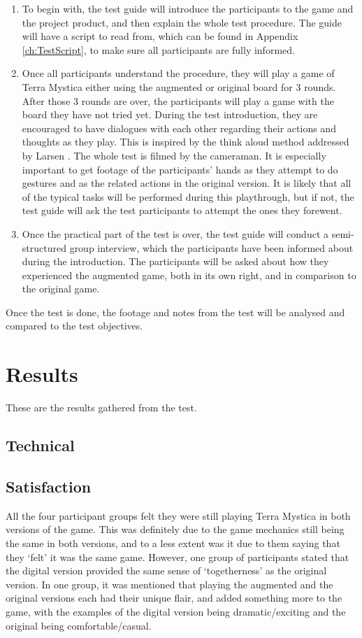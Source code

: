 \begin{enumerate}
\item To begin with, the test guide will introduce the participants to the game and the project product, and then explain the whole test procedure. The guide will have a script to read from, which can be found in Appendix \ref{ch:TestScript}, to make sure all participants are fully informed.
\item Once all participants understand the procedure, they will play a game of Terra Mystica either using the augmented or original board for 3 rounds. After those 3 rounds are over, the participants will play a game with the board they have not tried yet. During the test introduction, they are encouraged to have dialogues with each other regarding their actions and thoughts as they play. This is inspired by the think aloud method addressed by Larsen \citep{TestingLecture}. The whole test is filmed by the cameraman. It is especially important to get footage of the participants' hands as they attempt to do gestures and as the related actions in the original version. It is likely that all of the typical tasks will be performed during this playthrough, but if not, the test guide will ask the test participants to attempt the ones they forewent.
\item Once the practical part of the test is over, the test guide will conduct a semi-structured group interview, which the participants have been informed about during the introduction. The participants will be asked about how they experienced the augmented game, both in its own right, and in comparison to the original game.
\end{enumerate}

Once the test is done, the footage and notes from the test will be analysed and compared to the test objectives.

\section{Results}
These are the results gathered from the test.

\subsection{Technical}
\subsection{Satisfaction}\label{satisfactionResult}
All the four participant groups felt they were still playing Terra Mystica in both versions of the game. This was definitely due to the game mechanics still being the same in both versions, and to a less extent was it due to them saying that they ‘felt’ it was the same game. However, one group of participants stated that the digital version provided the same sense of ‘togetherness’ as the original version. In one group, it was mentioned that playing the augmented and the original versions each had their unique flair, and added something more to the game, with the examples of the digital version being dramatic/exciting and the original being comfortable/casual. 

